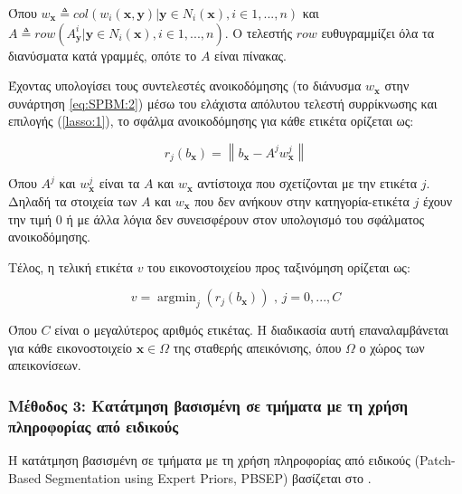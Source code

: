 \documentclass[a4paper,12pt]{article}
\newcommand{\argminB}{\mathop{\mathrm{argmin}}}
\newcommand\norm[1]{\left\lVert#1\right\rVert}
\begin{document}
Όπου $w_{\bm{x}} \triangleq col( w_i( \bm{x}, \bm{y}) | \bm{y} \in N_i( \bm{x}),
i \in {{1,...,n}})$ και \\
$A \triangleq row( {{A_{\bm{y}}^i | \bm{y} \in N_i(\bm{x}), i \in {{1,...,n}}
}})$. Ο τελεστής $row$ ευθυγραμμίζει όλα τα διανύσματα κατά γραμμές, οπότε το
$A$ είναι πίνακας.

Έχοντας υπολογίσει τους συντελεστές ανοικοδόμησης (το διάνυσμα $w_{\bm{x}}$ στην
συνάρτηση \eqref{eq:SPBM:2}) μέσω του ελάχιστα απόλυτου τελεστή συρρίκνωσης και
επιλογής (\ref{lasso:1}), το σφάλμα ανοικοδόμησης για κάθε ετικέτα ορίζεται ως:

\begin{equation} 
    r_j(b_{\bm{x}}) = \norm{ b_{\bm{x}} - A^j w_{\bm{x}}^j }
\end{equation}

Όπου $A^j$ και $w_{\bm{x}}^j$ είναι τα $A$ και $w_{\bm{x}}$ αντίστοιχα που
σχετίζονται με την ετικέτα $j$. Δηλαδή τα στοιχεία των $A$ και $w_{\bm{x}}$ που
δεν ανήκουν στην κατηγορία-ετικέτα $j$ έχουν την τιμή $0$ ή με άλλα λόγια δεν
συνεισφέρουν στον υπολογισμό του σφάλματος ανοικοδόμησης.

Τέλος, η τελική ετικέτα $v$ του εικονοστοιχείου προς ταξινόμηση ορίζεται ως:

\begin{equation*} 
    v = \argminB_{j} { \left( r_j(b_{\bm{x}}) \right) } \text{ , } j = 0,...,C
\end{equation*}

Όπου $C$ είναι ο μεγαλύτερος αριθμός ετικέτας. Η διαδικασία αυτή επαναλαμβάνεται
για κάθε εικονοστοιχείο $\bm{x} \in \Omega$ της σταθερής απεικόνισης, όπου
$\Omega$ ο χώρος των απεικονίσεων.


\subsubsection{Μέθοδος 3: Κατάτμηση βασισμένη σε τμήματα με τη χρήση πληροφορίας
από ειδικούς}

Η κατάτμηση βασισμένη σε τμήματα με τη χρήση πληροφορίας από ειδικούς
(Patch-Based Segmentation using Expert Priors, PBSEP) βασίζεται στο
\cite{Coupe:1}. 

\end{document}
